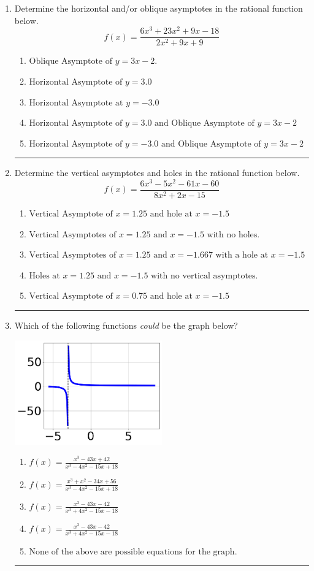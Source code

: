\documentclass[14pt]{extbook}
\newcommand{\litem}[1]{\item#1\hspace*{-1cm}\rule{\textwidth}{0.4pt}}
\begin{document}
\begin{enumerate}
\litem{
Determine the horizontal and/or oblique asymptotes in the rational function below.\[ f(x) = \frac{6x^{3} +23 x^{2} +9 x -18}{2x^{2} +9 x + 9} \]\begin{enumerate}[label=\Alph*.]
\item \( \text{Oblique Asymptote of } y = 3x -2. \)
\item \( \text{Horizontal Asymptote of } y = 3.0  \)
\item \( \text{Horizontal Asymptote at } y = -3.0 \)
\item \( \text{Horizontal Asymptote of } y = 3.0 \text{ and Oblique Asymptote of } y = 3x -2 \)
\item \( \text{Horizontal Asymptote of } y = -3.0 \text{ and Oblique Asymptote of } y = 3x -2 \)

\end{enumerate} }
\litem{
Determine the vertical asymptotes and holes in the rational function below.\[ f(x) = \frac{6x^{3} -5 x^{2} -61 x -60}{8x^{2} +2 x -15} \]\begin{enumerate}[label=\Alph*.]
\item \( \text{Vertical Asymptote of } x = 1.25 \text{ and hole at } x = -1.5 \)
\item \( \text{Vertical Asymptotes of } x = 1.25 \text{ and } x = -1.5 \text{ with no holes.} \)
\item \( \text{Vertical Asymptotes of } x = 1.25 \text{ and } x = -1.667 \text{ with a hole at } x = -1.5 \)
\item \( \text{Holes at } x = 1.25 \text{ and } x = -1.5 \text{ with no vertical asymptotes.} \)
\item \( \text{Vertical Asymptote of } x = 0.75 \text{ and hole at } x = -1.5 \)

\end{enumerate} }
\litem{
Which of the following functions \textit{could} be the graph below?
\begin{center}
    \includegraphics[width=0.5\textwidth]{../Figures/identifyGraphOfRationalFunctionCopyC.png}
\end{center}
\begin{enumerate}[label=\Alph*.]
\item \( f(x)=\frac{x^{3} -43 x + 42}{x^{3} -4 x^{2} -15 x + 18} \)
\item \( f(x)=\frac{x^{3} + x^{2} -34 x + 56}{x^{3} -4 x^{2} -15 x + 18} \)
\item \( f(x)=\frac{x^{3} -43 x -42}{x^{3} +4 x^{2} -15 x -18} \)
\item \( f(x)=\frac{x^{3} -43 x -42}{x^{3} +4 x^{2} -15 x -18} \)
\item \( \text{None of the above are possible equations for the graph.} \)


\end{enumerate}}
\end{enumerate}
\end{document}
